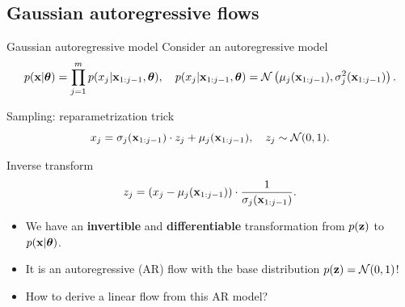\subsection{Gaussian autoregressive flows}
\begin{frame}{Gaussian autoregressive model}
	Consider an autoregressive model
	\vspace{-0.3cm}
	{\small
		\[
		p(\mathbf{x} | \boldsymbol{\theta}) = \prod_{j=1}^m p(x_j | \mathbf{x}_{1:j - 1}, \boldsymbol{\theta}), \quad
		p(x_j | \mathbf{x}_{1:j - 1}, \boldsymbol{\theta}) = \mathcal{N} \left(\mu_j(\mathbf{x}_{1:j-1}), \sigma^2_j (\mathbf{x}_{1:j-1})\right).
		\]
	}
	\vspace{-0.5cm}
	\begin{block}{Sampling: reparametrization trick}
		\vspace{-0.3cm}
		\[
			x_j = \sigma_j (\mathbf{x}_{1:j-1}) \cdot z_j + \mu_j(\mathbf{x}_{1:j-1}), \quad z_j \sim \mathcal{N}(0, 1).
		\]
		\vspace{-0.7cm}
	\end{block}
	\begin{block}{Inverse transform}
		\vspace{-0.3cm}
		\[
			z_j = \left(x_j - \mu_j(\mathbf{x}_{1:j-1}) \right) \cdot \frac{1}{\sigma_j (\mathbf{x}_{1:j-1}) }.
		\]
		\vspace{-0.4cm}
	\end{block}
	\begin{itemize}
		\item We have an \textbf{invertible} and \textbf{differentiable} transformation from $p(\mathbf{z})$ to $p(\mathbf{x} | \boldsymbol{\theta})$.
		\item It is an autoregressive (AR) flow with the base distribution $p(\mathbf{z}) = \mathcal{N}(0, 1)$!
		\item How to derive a linear flow from this AR model?
	\end{itemize}
\end{frame}
